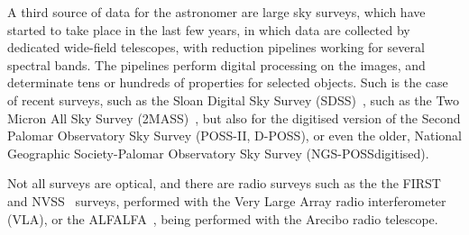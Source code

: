 
	 A third source of data for the astronomer are large sky surveys,
	which have started to take place in the last few years, in which
	data are collected by dedicated wide-field telescopes, with
	reduction pipelines working for several spectral bands. The
	pipelines perform digital processing on the images, and
	determinate tens or hundreds of properties for selected objects.
	Such is the case of recent surveys, such as the Sloan Digital
	Sky Survey (SDSS)~\cite{1995wfsd.conf....3G,
	2000AJ....120.1579Y}, such as the Two Micron All Sky Survey
	(2MASS)~\cite{2006AJ....131.1163S}, but also for the digitised
	version of the Second Palomar Observatory Sky Survey (POSS-II,
	D-POSS), or even the older, National Geographic Society-Palomar
	Observatory Sky Survey (NGS-POSSdigitised).


	 Not all surveys are optical, and there are radio surveys such
	as the the FIRST~\cite{1994ASPC...61..165B} and
	NVSS~\cite{1993BAAS...25.1389C} surveys, performed with the
	Very Large Array radio interferometer (VLA), or the
	ALFALFA~\cite{2008arXiv0806.1670H, 2005AJ....130.2598G}, being
	performed with the Arecibo radio telescope.
	
%	
%		
%	

